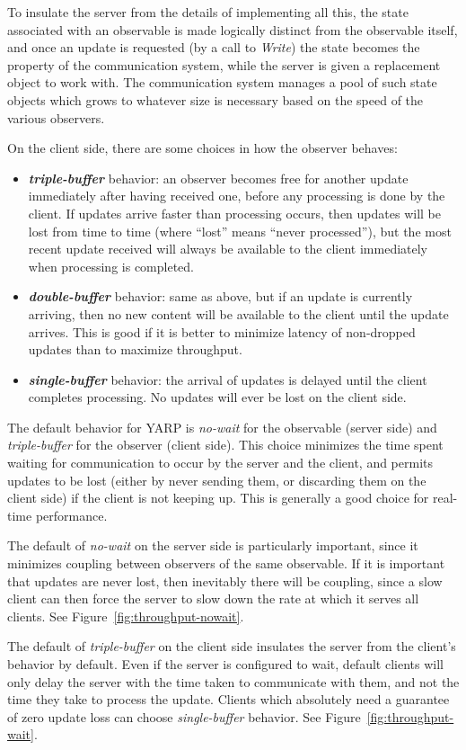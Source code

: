\noindent
%
To insulate the server from the details of implementing all this, the
state associated with an observable is made logically distinct from
the observable itself, and once an update is requested (by a call to
{\em Write}) the state becomes the property of the communication
system, while the server is given a replacement object to work with.
%
The communication system manages a pool of such state objects which
grows to whatever size is necessary based on the speed of the various
observers.
%

On the client side, there are some choices in how the
observer behaves:

\begin{itemize} \pflist

\item \textbf{\textit{triple-buffer}} behavior: an observer becomes free for
another update immediately after having received one, before any
processing is done by the client.  If updates arrive faster than
processing occurs, then updates will be lost from time to time (where
``lost'' means ``never processed''), but the most recent update
received will always be available to the client immediately when processing
is completed.

\item \textbf{\textit{double-buffer}} behavior: same as above, but if
an update is currently arriving, then no new content will be available
to the client until the update arrives.  This is good if it is better
to minimize latency of non-dropped updates than to maximize
throughput.

\item \textbf{\textit{single-buffer}} behavior: the arrival of updates
is delayed until the client completes processing.  No updates will ever be 
lost on the client side.


\end{itemize}

\noindent The default behavior for YARP is \textit{no-wait} for
the observable (server side) and \textit{triple-buffer} for 
the observer (client side).  This
choice minimizes the time spent waiting for communication to occur by
the server and the client, and permits updates to be lost (either by
never sending them, or discarding them on the client side) if the
client is not keeping up.  This is generally a good choice for
real-time performance.

The default of \textit{no-wait} on the server side is particularly
important, since it minimizes coupling between observers of the same
observable.  If it is important that updates are never lost, then
inevitably there will be coupling, since a slow client can then force
the server to slow down the rate at which it serves all clients.
See Figure~\ref{fig:throughput-nowait}.

The default of \textit{triple-buffer} on the client side insulates the
server from the client's behavior by default.  Even if the server is
configured to wait, default clients will only delay the server
with the time taken to communicate with them, and not the time
they take to process the update.  Clients which absolutely
need a guarantee of zero update loss can choose \textit{single-buffer}
behavior.  See Figure~\ref{fig:throughput-wait}.


